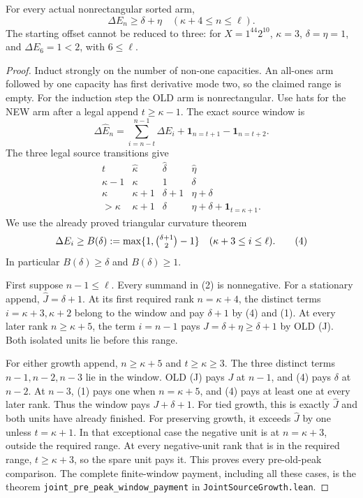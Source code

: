 \begin{theorem}
For every actual nonrectangular sorted arm,
\[
             \boxed{\Delta E_n\ge\delta+\eta
                         \quad(\kappa+4\le n\le\ell).}       \tag{J}
\]
The starting offset cannot be reduced to three: for
$X=1^{44}2^{10}$, $\kappa=3$, $\delta=\eta=1$, and
$\Delta E_6=1<2$, with $6\le\ell$.
\end{theorem}
\begin{proof}
Induct strongly on the number of non-one capacities. An all-ones arm
followed by one capacity has first derivative mode two, so the claimed
range is empty. For the induction step the OLD arm is nonrectangular.
Use hats for the NEW arm after a legal append $t\ge\kappa-1$.
The exact source window is
\[
 \Delta\widehat E_n
   =\sum_{i=n-t}^{n-1}\Delta E_i
           +\mathbf1_{n=t+1}-\mathbf1_{n=t+2}.                \tag{2}
\]
The three legal source transitions give
\[
\begin{array}{c|c|c|c}
 t&\widehat\kappa&\widehat\delta&\widehat\eta\\ \hline
 \kappa-1&\kappa&1&\delta\\
 \kappa&\kappa+1&\delta+1&\eta+\delta\\
 >\kappa&\kappa+1&\delta&\eta+\delta+\mathbf1_{t=\kappa+1}.
\end{array}                                                   \tag{3}
\]
We use the already proved triangular curvature theorem
\[
 \Delta E_i\ge B(\delta):=\max\{1,\tbinom{\delta+1}{2}-1\}
                  \quad(\kappa+3\le i\le\ell).                \tag{4}
\]
In particular $B(\delta)\ge\delta$ and $B(\delta)\ge1$.

First suppose $n-1\le\ell$. Every summand in (2) is nonnegative.
For a stationary append, $\widehat J=\delta+1$. At its first required
rank $n=\kappa+4$, the distinct terms $i=\kappa+3,\kappa+2$
belong to the window and pay $\delta+1$ by (4) and (1).
At every later rank $n\ge\kappa+5$, the term $i=n-1$ pays
$J=\delta+\eta\ge\delta+1$ by OLD (J). Both isolated units lie
before this range.

For either growth append, $n\ge\kappa+5$ and $t\ge\kappa\ge3$.
The three distinct terms $n-1,n-2,n-3$ lie in the window.
OLD (J) pays $J$ at $n-1$, and (4) pays $\delta$ at $n-2$.
At $n-3$, (1) pays one when $n=\kappa+5$, and (4) pays at least
one at every later rank. Thus the window pays $J+\delta+1$.
For tied growth, this is exactly $\widehat J$ and both units have
already finished. For preserving growth, it exceeds $\widehat J$
by one unless $t=\kappa+1$. In that exceptional case the negative
unit is at $n=\kappa+3$, outside the required range. At every
negative-unit rank that is in the required range, $t\ge\kappa+3$,
so the spare unit pays it. This proves every pre-old-peak comparison.
The complete finite-window payment, including all these cases, is
the theorem \texttt{joint\_pre\_peak\_window\_payment} in
\texttt{JointSourceGrowth.lean}.


\end{proof}
